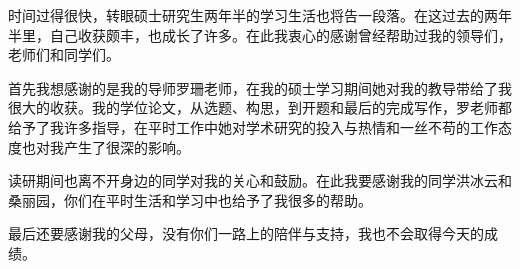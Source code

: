 

\begin{acknowledgements}
  时间过得很快，转眼硕士研究生两年半的学习生活也将告一段落。在这过去的两年半里，自己收获颇丰，也成长了许多。在此我衷心的感谢曾经帮助过我的领导们，老师们和同学们。

  首先我想感谢的是我的导师罗珊老师，在我的硕士学习期间她对我的教导带给了我很大的收获。我的学位论文，从选题、构思，到开题和最后的完成写作，罗老师都给予了我许多指导，在平时工作中她对学术研究的投入与热情和一丝不苟的工作态度也对我产生了很深的影响。

  读研期间也离不开身边的同学对我的关心和鼓励。在此我要感谢我的同学洪冰云和桑丽园，你们在平时生活和学习中也给予了我很多的帮助。

  最后还要感谢我的父母，没有你们一路上的陪伴与支持，我也不会取得今天的成绩。
\end{acknowledgements}


